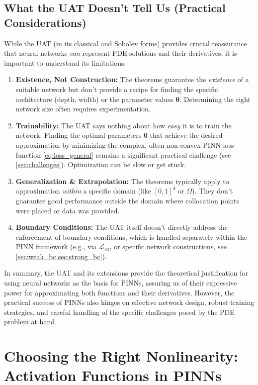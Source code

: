 \subsection{What the UAT Doesn't Tell Us (Practical Considerations)}

While the UAT (in its classical and Sobolev forms) provides crucial reassurance that neural networks \emph{can} represent PDE solutions and their derivatives, it is important to understand its limitations:

\begin{enumerate}
    \item \textbf{Existence, Not Construction:} The theorems guarantee the \textit{existence} of a suitable network but don't provide a recipe for finding the specific architecture (depth, width) or the parameter values $\boldsymbol{\theta}$. Determining the right network size often requires experimentation.
    \item \textbf{Trainability:} The UAT says nothing about how \emph{easy} it is to train the network. Finding the optimal parameters $\boldsymbol{\theta}$ that achieve the desired approximation by minimizing the complex, often non-convex PINN loss function \eqref{eq:loss_general} remains a significant practical challenge (see \cref{sec:challenges}). Optimization can be slow or get stuck.
    \item \textbf{Generalization \& Extrapolation:} The theorems typically apply to approximation \textit{within} a specific domain (like $[0,1]^d$ or $\Omega$). They don't guarantee good performance outside the domain where collocation points were placed or data was provided.
    \item \textbf{Boundary Conditions:} The UAT itself doesn't directly address the enforcement of boundary conditions, which is handled separately within the PINN framework (e.g., via $\mathcal{L}_{\text{BC}}$ or specific network constructions, see \cref{sec:weak_bc,sec:strong_bc}).
\end{enumerate}

In summary, the UAT and its extensions provide the theoretical justification for using neural networks as the basis for PINNs, assuring us of their expressive power for approximating both functions and their derivatives. However, the practical success of PINNs also hinges on effective network design, robust training strategies, and careful handling of the specific challenges posed by the PDE problem at hand.

\section{Choosing the Right Nonlinearity: Activation Functions in PINNs}
\label{sec:activation_functions}

